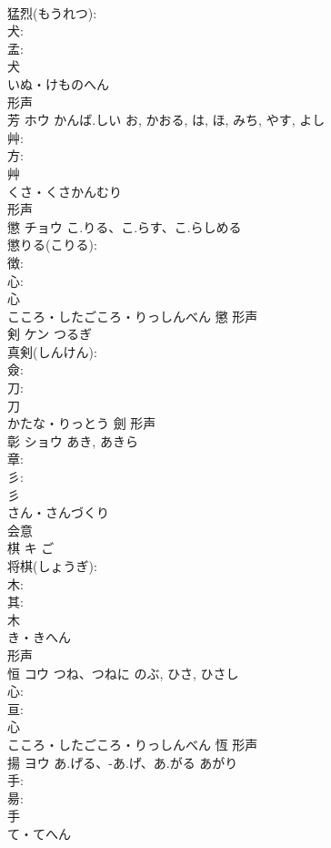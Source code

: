 \documentclass[8pt]{extreport}
\begin{document}
\begin{CJK}{UTF8}{min}
\\	猛烈(もうれつ): 
\\	犬: 
\\	孟: 
\\	犬	
\\	いぬ・けものへん	
\\	形声 
\\	芳	ホウ	かんば.しい	お, かおる, は, ほ, みち, やす, よし	
\\	艸: 
\\	方: 
\\	艸	
\\	くさ・くさかんむり	
\\	形声 
\\	懲	チョウ	こ.りる、こ.らす、こ.らしめる		
\\	懲りる(こりる): 
\\	徴: 
\\	心: 
\\	心	
\\	こころ・したごころ・りっしんべん	懲	形声 
\\	剣	ケン	つるぎ		
\\	真剣(しんけん): 
\\	僉: 
\\	刀: 
\\	刀	
\\	かたな・りっとう	劍	形声 
\\	彰	ショウ		あき, あきら	
\\	章: 
\\	彡: 
\\	彡	
\\	さん・さんづくり	
\\	会意 
\\	棋	キ	ご		
\\	将棋(しょうぎ): 
\\	木: 
\\	其: 
\\	木	
\\	き・きへん	
\\	形声 
\\	恒	コウ	つね、つねに	のぶ, ひさ, ひさし	
\\	心: 
\\	亘: 
\\	心	
\\	こころ・したごころ・りっしんべん	恆	形声 
\\	揚	ヨウ	あ.げる、-あ.げ、あ.がる	あがり	
\\	手: 
\\	昜: 
\\	手	
\\	て・てへん	

\end{CJK}
\end{document}
